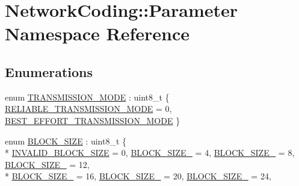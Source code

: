 \hypertarget{namespace_network_coding_1_1_parameter}{}\section{Network\+Coding\+:\+:Parameter Namespace Reference}
\label{namespace_network_coding_1_1_parameter}
\subsection*{Enumerations}
\begin{DoxyCompactItemize}
\item 
enum \hyperlink{namespace_network_coding_1_1_parameter_abacf67c35e36279a0efd7803530731b1}{T\+R\+A\+N\+S\+M\+I\+S\+S\+I\+O\+N\+\_\+\+M\+O\+DE} \+: uint8\+\_\+t \{ \hyperlink{namespace_network_coding_1_1_parameter_abacf67c35e36279a0efd7803530731b1a78d0d5e498668b5d6e88cdd199e33975}{R\+E\+L\+I\+A\+B\+L\+E\+\_\+\+T\+R\+A\+N\+S\+M\+I\+S\+S\+I\+O\+N\+\_\+\+M\+O\+DE} = 0, 
\hyperlink{namespace_network_coding_1_1_parameter_abacf67c35e36279a0efd7803530731b1a388c47889c687f4be03655d10c877690}{B\+E\+S\+T\+\_\+\+E\+F\+F\+O\+R\+T\+\_\+\+T\+R\+A\+N\+S\+M\+I\+S\+S\+I\+O\+N\+\_\+\+M\+O\+DE}
 \}
\item 
enum \hyperlink{namespace_network_coding_1_1_parameter_a28b92ccd4fb04190653869f4438eee1f}{B\+L\+O\+C\+K\+\_\+\+S\+I\+ZE} \+: uint8\+\_\+t \{ \\*
\hyperlink{namespace_network_coding_1_1_parameter_a28b92ccd4fb04190653869f4438eee1fa9d51666327fe6a7c6c9b2d47a30c6b70}{I\+N\+V\+A\+L\+I\+D\+\_\+\+B\+L\+O\+C\+K\+\_\+\+S\+I\+ZE} = 0, 
\hyperlink{namespace_network_coding_1_1_parameter_a28b92ccd4fb04190653869f4438eee1fa21f23f14ceaca162b4c03992d60416af}{B\+L\+O\+C\+K\+\_\+\+S\+I\+Z\+E\+\_} = 4, 
\hyperlink{namespace_network_coding_1_1_parameter_a28b92ccd4fb04190653869f4438eee1fad87e5103776899ab85c2d35426e0fb46}{B\+L\+O\+C\+K\+\_\+\+S\+I\+Z\+E\+\_} = 8, 
\hyperlink{namespace_network_coding_1_1_parameter_a28b92ccd4fb04190653869f4438eee1fab9a4570a3b7e6a23dd909cc6359c1809}{B\+L\+O\+C\+K\+\_\+\+S\+I\+Z\+E\+\_} = 12, 
\\*
\hyperlink{namespace_network_coding_1_1_parameter_a28b92ccd4fb04190653869f4438eee1fa23e3a5585851e3ac5afec6cacc6d5bc0}{B\+L\+O\+C\+K\+\_\+\+S\+I\+Z\+E\+\_} = 16, 
\hyperlink{namespace_network_coding_1_1_parameter_a28b92ccd4fb04190653869f4438eee1fa93854ef6994e32f77f6e843373e81527}{B\+L\+O\+C\+K\+\_\+\+S\+I\+Z\+E\+\_} = 20, 
\hyperlink{namespace_network_coding_1_1_parameter_a28b92ccd4fb04190653869f4438eee1fa79405f7d88e2d6326433ad776a467eb1}{B\+L\+O\+C\+K\+\_\+\+S\+I\+Z\+E\+\_} = 24, 

\end{DoxyCompactItemize}
